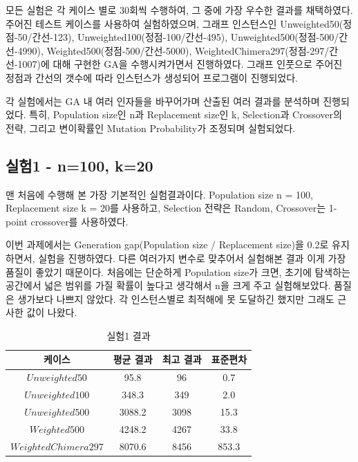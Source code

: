 \documentclass{article}
\begin{document}
모든 실험은 각 케이스 별로 30회씩 수행하여, 그 중에 가장 우수한 결과를 채택하였다. 주어진 테스트 케이스를 사용하여 실험하였으며, 그래프 인스턴스인 Unweighted50(정점-50/간선-123), Unweighted100(정점-100/간선-495), Unweighted500(정점-500/간선-4990), Weighted500(정점-500/간선-5000), WeightedChimera297(정점-297/간선-1007)에 대해 구현한 GA을 수행시켜가면서 진행하였다. 그래프 인풋으로 주어진 정점과 간선의 갯수에 따라 인스턴스가 생성되어 프로그램이 진행되었다.

각 실험에서는 GA 내 여러 인자들을 바꾸어가며 산출된 여러 결과를 분석하며 진행되었다. 특히, Population size인 n과 Replacement size인 k, Selection과 Crossover의 전략, 그리고 변이확률인 Mutation Probability가 조정되며 실험되었다.


\subsection{실험1 - n=100, k=20}

맨 처음에 수행해 본 가장 기본적인 실험결과이다. Population size n = 100, Replacement size k = 20를 사용하고, Selection 전략은 Random, Crossover는 1-point crossover를 사용하였다.

이번 과제에서는 Generation gap(Population size / Replacement size)을 0.2로 유지하면서, 실험을 진행하였다. 다른 여러가지 변수로 맞추어서 실험해본 결과 이게 가장 품질이 좋았기 때문이다. 처음에는 단순하게 Population size가 크면, 초기에 탐색하는 공간에서 넓은 범위를 가질 확률이 높다고 생각해서 n을 크게 주고 실험해보았다. 품질은 생가보다 나쁘지 않았다. 각 인스턴스별로 최적해에 못 도달하긴 했지만 그래도 근사한 값이 나왔다.



 \begin{table}[h]
 \begin{center}
\caption{실험1 결과}
\begin{tabular}{cccc}
\hline\hline
케이스 & 평균 결과 & 최고 결과 & 표준편차\\
\hline\hline
$Unweighted 50$ & 95.8 & 96 & 0.7\\
\hline
$Unweighted 100$ & 348.3 & 349 & 2.0\\
\hline
$Unweighted 500$ & 3088.2 & 3098 & 15.3\\
\hline
$Weighted 500$ & 4248.2 & 4267 & 33.8\\
\hline
$Weighted Chimera 297$ & 8070.6 & 8456 & 853.3\\
\hline
\end{tabular}
\end{center}
\end{table}
\end{document}
